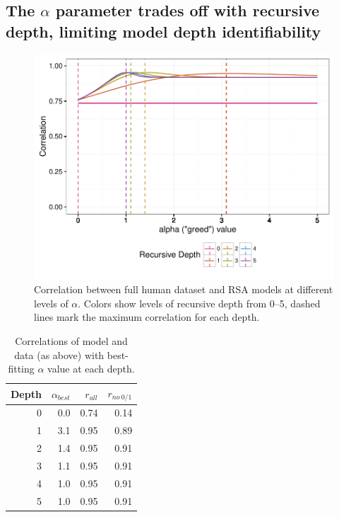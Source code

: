 \documentclass[man,noapacite]{apa2}
\begin{document}
\subsection{The $\alpha$ parameter trades off with recursive depth, limiting model depth identifiability}

\begin{figure}[t]
 \centering
 \includegraphics[width=5in]{../plots/alpha-fit.pdf}
 \caption{\label{fig:alpha-fit} Correlation between full human dataset and RSA models at different levels of $\alpha$. Colors show levels of recursive depth from 0--5, dashed lines mark the maximum correlation for each depth.}
\end{figure}

\begin{table}[ht]
\centering
\begin{tabular}{rrrr}
  \hline
Depth & $\alpha_{best}$ & $r_{all}$ & $r_{no~0/1}$ \\
  \hline
  0 & 0.0 & 0.74 & 0.14 \\
    1 & 3.1 & 0.95 & 0.89 \\
    2 & 1.4 & 0.95 & 0.91 \\
    3 & 1.1 & 0.95 & 0.91 \\
    4 & 1.0 & 0.95 & 0.91 \\
    5 & 1.0 & 0.95 & 0.91 \\
   \hline
\end{tabular}
\caption{\label{tab:corrs-fita} Correlations of model and data (as above) with best-fitting $\alpha$ value at each depth.}
\end{table}
\end{document}
